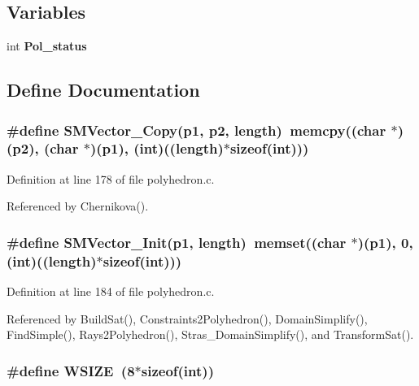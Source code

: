 \subsection*{Variables}
\begin{CompactItemize}
\item 
int {\bf Pol\_\-status}
\end{CompactItemize}


\subsection{Define Documentation}
\subsubsection{\setlength{\rightskip}{0pt plus 5cm}\#define SMVector\_\-Copy(p1, p2, length)\ memcpy((char $\ast$)(p2), (char $\ast$)(p1), (int)((length)$\ast$sizeof(int)))}\label{polyhedron_8c_a3}




Definition at line 178 of file polyhedron.c.

Referenced by Chernikova().

\subsubsection{\setlength{\rightskip}{0pt plus 5cm}\#define SMVector\_\-Init(p1, length)\ memset((char $\ast$)(p1), 0, (int)((length)$\ast$sizeof(int)))}\label{polyhedron_8c_a4}




Definition at line 184 of file polyhedron.c.

Referenced by Build\-Sat(), Constraints2Polyhedron(), Domain\-Simplify(), Find\-Simple(), Rays2Polyhedron(), Stras\_\-Domain\-Simplify(), and Transform\-Sat().

\subsubsection{\setlength{\rightskip}{0pt plus 5cm}\#define WSIZE\ (8$\ast$sizeof(int))}\label{polyhedron_8c_a0}




